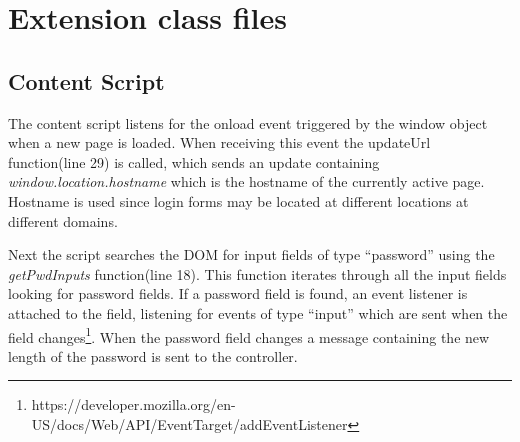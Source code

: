 \chapter{Extension class files}\label{extension-classes}

\section{Content Script}\label{app:content-script}


The content script listens for the onload event triggered by the window object when a new page is loaded. When receiving this event the updateUrl function(line 29) is called, which sends an update containing  \emph{window.location.hostname} which is the hostname of the currently active page. Hostname is used since login forms may be located at different locations at different domains.
\par Next the script searches the DOM for input fields of type ``password'' using the \emph{getPwdInputs} function(line 18). This function iterates through all the input fields looking for password fields. If a password field is found, an event listener is attached to the field, listening for events of type ``input'' which are sent when the field changes\footnote{https://developer.mozilla.org/en-US/docs/Web/API/EventTarget/addEventListener}. When the password field changes a message containing the new length of the password is sent to the controller. 

